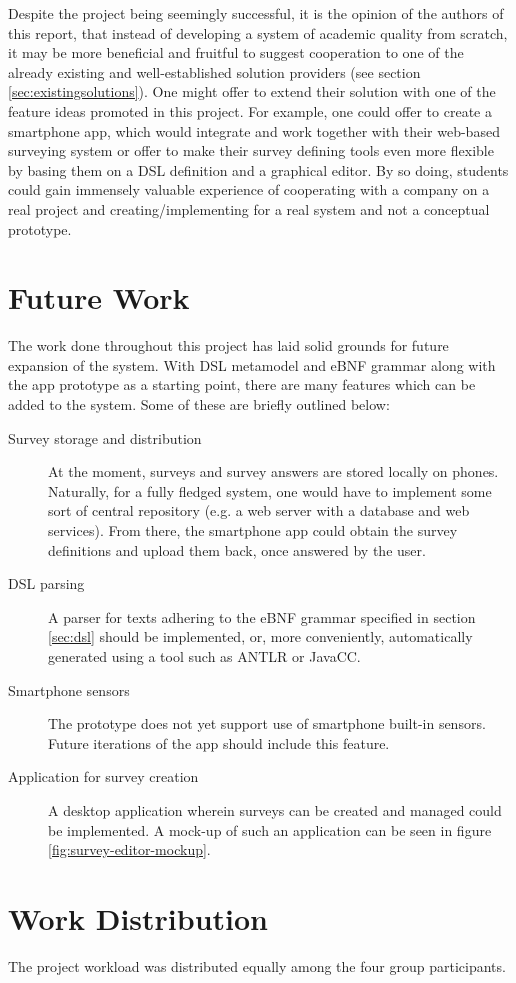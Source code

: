 Despite the project being seemingly successful, it is the opinion of the authors of this report, that instead of developing a system of academic quality from scratch, it may be more beneficial and fruitful to suggest cooperation to one of the already existing and well-established solution providers (see section \ref{sec:existingsolutions}). One might offer to extend their solution with one of the feature ideas promoted in this project. For example, one could offer to create a smartphone app, which would integrate and work together with their web-based surveying system or offer to make their survey defining tools even more flexible by basing them on a DSL definition and a graphical editor.
By so doing, students could gain immensely valuable experience of cooperating with a company on a real project and creating/implementing for a real system and not a conceptual prototype.

\section{Future Work}
\label{sec:futurework}
The work done throughout this project has laid solid grounds for future expansion of the system. With DSL metamodel and eBNF grammar along with the app prototype as a starting point, there are many features which can be added to the system. Some of these are briefly outlined below:
\begin{description}
\item[Survey storage and distribution] At the moment, surveys and survey answers are stored locally on phones. Naturally, for a fully fledged system, one would have to implement some sort of central repository (e.g. a web server with a database and web services). From there, the smartphone app could obtain the survey definitions and upload them back, once answered by the user.
\item[DSL parsing] A parser for texts adhering to the eBNF grammar specified in section \ref{sec:dsl} should be implemented, or, more conveniently, automatically generated using a tool such as ANTLR or JavaCC.
\item[Smartphone sensors] The prototype does not yet support use of smartphone built-in sensors. Future iterations of the app should include this feature.
\item[Application for survey creation] A desktop application wherein surveys can be created and managed could be implemented. A mock-up of such an application can be seen in figure \ref{fig:survey-editor-mockup}.
\end{description}

\section{Work Distribution}
\label{sec:workdistribution}
The project workload was distributed equally among the four group participants.